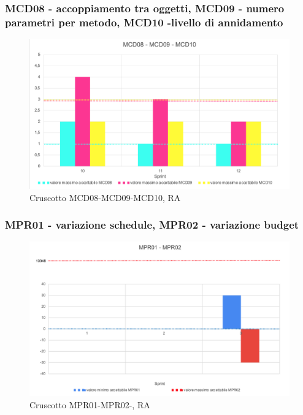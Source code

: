\subsubsection*{MCD08 - accoppiamento tra oggetti, MCD09 - numero parametri per metodo, MCD10 -livello di annidamento }

\begin{figure}[H] 
    \centering
    \includegraphics[scale = 0.8]{immagini/ImmRA/MCD080910.png}
    \caption{Cruscotto MCD08-MCD09-MCD10, RA}
\end{figure}

\subsubsection*{MPR01 - variazione schedule, MPR02 - variazione budget}

\begin{figure}[H] 
    \centering
    \includegraphics[scale = 0.6]{immagini/ImmRA/MPR0102.png}
    \caption{Cruscotto MPR01-MPR02-, RA}
\end{figure}

